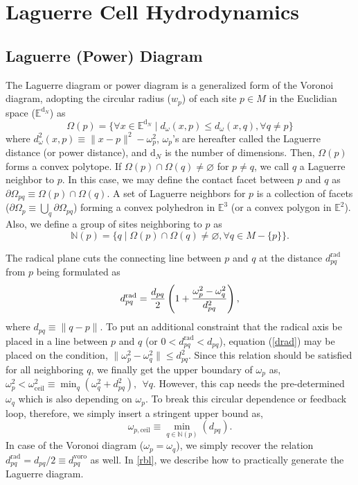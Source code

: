 \documentclass[twocolumn]{aastex63}
\begin{document}
\section{Laguerre Cell Hydrodynamics}

\subsection{Laguerre (Power) Diagram}
The Laguerre diagram or power diagram is a generalized form of the Voronoi diagram, adopting the circular radius ($w_p$) of each site $p\in M$ in the Euclidian space ($\mathbb{E}^{\textrm{d}_N}$) as
\begin{equation}
	\Omega(p) = \{\forall x \in  \mathbb{E}^{\textrm{d}_N}\mid d_\omega(x, p) \le  d_\omega(x, q), \forall q \ne p\}
\end{equation}
where $d^2_\omega(x,p)\equiv {\|x-p\|^2 -\omega_p^2}$, $\omega_p$'s are hereafter called the Laguerre distance (or power distance), and $\textrm{d}_{N}$ is the number of dimensions. Then, $\Omega(p)$ forms a convex polytope. If $\Omega(p)\cap \Omega(q) \ne \varnothing$ for $p\ne q$, we call $q$ a Laguerre neighbor to $p$. In this case, we may define the contact facet between $p$ and $q$ as $\partial\Omega_{pq} \equiv \Omega(p) \cap \Omega(q)$. A set of Laguerre neighbors for $p$ is a collection of facets ($\partial\Omega_p \equiv \bigcup_q \partial\Omega_{pq}$) forming a convex polyhedron in $\mathbb{E}^3$ (or a convex polygon in $\mathbb{E}^2$). Also, we define a group of sites neighboring to $p$ as
\begin{equation}
	\mathbb{N}(p) = \{ q \mid \Omega(p)\cap \Omega(q) \ne \varnothing,    \forall q \in M-\{p\} \}.
\end{equation}

The radical plane cuts the connecting line between $p$ and $q$ at the distance $d^{\textrm{rad}}_{pq}$ from $p$ being formulated as
\begin{equation} \label{drad}
	{d_{pq}^\textrm{rad} } = {d_{pq}\over2} \left( 1 + { \omega_p^2 - \omega_q^2\over d^2_{pq}}\right),
\end{equation}
where $d_{pq} \equiv \| q-p\| $.  To put an additional constraint that the radical axis be placed in a line between $p$ and $q$ (or $0< d_{pq}^\textrm{rad}< d_{pq}$), equation (\ref{drad}) may be placed on the condition, $
\| \omega_p^2 -\omega_q^2\| \le    { d_{pq}^2}$.
Since this relation should be satisfied for all neighboring $q$, we finally get the upper boundary of $\omega_p$ as,
$
	\omega^2_p < \omega^2_{\textrm{ceil}}\equiv \min_q\left( \omega_q^2 +d_{pq}^2\right) , ~~ \forall q.
$
However, this cap needs the pre-determined  $\omega_q$ which is also depending on  $\omega_p$. To break this circular dependence or feedback loop, therefore, we simply insert a stringent upper bound as,
\begin{equation}
	\omega_{p,\textrm{ceil}} \equiv \min_{q\in\mathbb{N}(p)}(d_{pq}).
\end{equation}
In case of the Voronoi diagram ($\omega_p=\omega_q$), we simply recover the relation $d_{pq}^\textrm{rad} = d_{pq}/2 \equiv d_{pq}^\textrm{voro}$ as well. 
In \ref{rbl}, we describe how to practically generate the Laguerre diagram.
\end{document}
